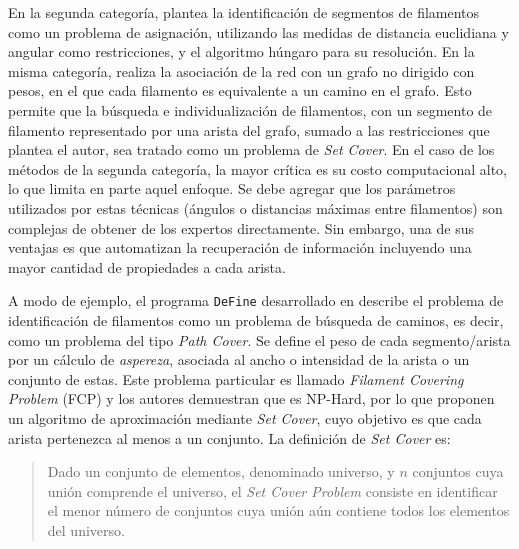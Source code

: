 \documentclass{article}
\begin{document}
En la segunda categor\'ia, \cite{cerda2014geometrical} plantea la identificaci\'on de segmentos de filamentos como un problema de asignaci\'on, utilizando las medidas de distancia euclidiana y angular como restricciones, y el algoritmo h\'ungaro para su resoluci\'on. En la misma categor\'ia, \cite{breuer2015define} realiza la asociaci\'on de la red con un grafo no dirigido con pesos, en el que cada filamento es equivalente a un camino en el grafo. Esto permite que la b\'usqueda e individualizaci\'on de filamentos, con un segmento de filamento representado por una arista del grafo, sumado a las restricciones que plantea el autor, sea tratado como un problema de {\it Set Cover}. En el caso de los m\'etodos de la segunda categor\'ia, la mayor cr\'itica es su costo computacional alto, lo que limita en parte aquel enfoque. Se debe agregar que los par\'ametros utilizados por estas t\'ecnicas (\'angulos o  distancias m\'aximas entre filamentos) son complejas de obtener de los expertos directamente. Sin embargo, una de sus ventajas es que automatizan la recuperaci\'on de informaci\'on incluyendo una mayor cantidad de propiedades a cada arista. 

\medskip

A modo de ejemplo, el programa \texttt{DeFine} desarrollado en \cite{breuer2015define} describe el problema de identificaci\'on de filamentos como un problema de b\'usqueda de caminos, es decir, como un problema del tipo {\it Path Cover}. Se define el peso de cada segmento/arista por un c\'alculo de {\it aspereza}, asociada al ancho o intensidad de la arista o un conjunto de estas.
Este problema particular es llamado {\it Filament Covering Problem} (FCP) y los autores demuestran que es NP-Hard, por lo que proponen un algoritmo de aproximaci\'on mediante \textit{Set Cover}, cuyo objetivo es que cada arista pertenezca al menos a un conjunto. La definici\'on de {\it Set Cover} es:

\begin{quote}
Dado un conjunto de elementos, denominado universo, y $n$ conjuntos cuya unión comprende el universo, el {\it Set Cover Problem} consiste en identificar el menor n\'umero de conjuntos cuya unión a\'un contiene todos los elementos del universo.
\end{quote}
\end{document}
